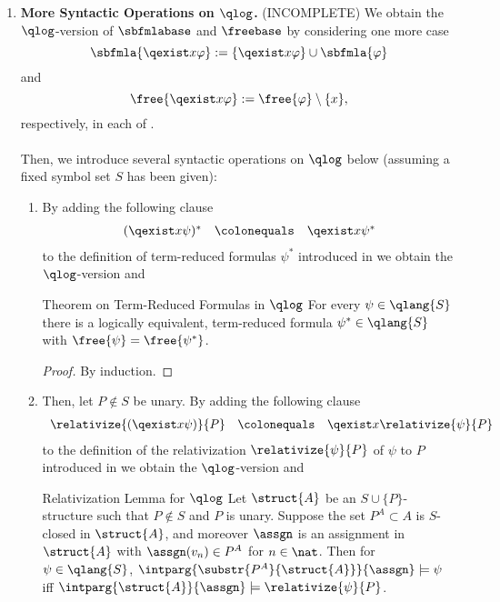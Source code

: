 \begin{enumerate}[1.]
\item \textbf{More Syntactic Operations on $\qlog$.} (INCOMPLETE) We obtain the $\qlog$-version of $\sbfmlabase$ and $\freebase$ by considering one more case
\[
\sbfmla{\qexist x \varphi} := \{ \qexist x \varphi \} \cup \sbfmla{\varphi}
\]
and
\[
\free{\qexist x \varphi} := \free{\varphi} \setminus \{ x \},
\]
respectively, in each of .\\
\ \\
Then, we introduce several syntactic operations on $\qlog$ below (assuming a fixed symbol set $S$ has been given):
\begin{enumerate}[(1)]
\item By adding the following clause
\[
\begin{array}{lll}
(\qexist x \psi)^\ast & \colonequals & \qexist x \psi^\ast
\end{array}
\]
to the definition of term-reduced formulas $\psi^\ast$ introduced in  we obtain the $\qlog$-version and\medskip\\
\begin{theorem}{Theorem on Term-Reduced Formulas in $\qlog$}
For every $\psi \in \qlang{S}$ there is a logically equivalent, term-reduced formula $\psi^\ast \in \qlang{S}$ with $\free{\psi} = \free{\psi^\ast}$.
\end{theorem}
\begin{proof}
By induction.
\end{proof}
\item Then, let $P \not\in S$ be unary. By adding the following clause
\[
\begin{array}{lll}
\relativize{(\qexist x \psi)}{P} & \colonequals & \qexist x \relativize{\psi}{P}
\end{array}
\]
to the definition of the relativization $\relativize{\psi}{P}$ of $\psi$ to $P$ introduced in  we obtain the $\qlog$-version and\medskip\\
\begin{theorem}{Relativization Lemma for $\qlog$}
Let $\struct{A}$ be an $S \cup \{ P \}$-structure such that $P \not\in S$ and $P$ is unary. Suppose the set $P^A \subset A$ is $S$-closed in $\struct{A}$, and moreover $\assgn$ is an assignment in $\struct{A}$ with $\assgn(v_n) \in P^A$ for $n \in \nat$. Then for $\psi \in \qlang{S}$, $\intparg{\substr{P^A}{\struct{A}}}{\assgn} \models \psi$ \quad iff \quad $\intparg{\struct{A}}{\assgn} \models \relativize{\psi}{P}$.

\end{theorem}
\end{enumerate}
\end{enumerate}
